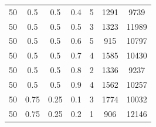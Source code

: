 \documentclass[12pt]{report}
\begin{document}
\begin{table}[H]
\begin{center}
\begin{tabular}{|c|c|c|c|c|c|c|}
				50 & 0.5 & 0.5 & 0.4 & 5 & 1291 & 9739 \\
				50 & 0.5 & 0.5 & 0.5 & 3 & 1323 & 11989 \\
				50 & 0.5 & 0.5 & 0.6 & 5 & 915 & 10797 \\
				50 & 0.5 & 0.5 & 0.7 & 4 & 1585 & 10430 \\
				50 & 0.5 & 0.5 & 0.8 & 2 & 1336 & 9237 \\
				50 & 0.5 & 0.5 & 0.9 & 4 & 1562 & 10257 \\
				50 & 0.75 & 0.25 & 0.1 & 3 & 1774 & 10032 \\
				50 & 0.75 & 0.25 & 0.2 & 1 & 906 & 12146 \\
				\hline
			\end{tabular}
		\end{center}
	\end{table}
	\newpage 
	
\end{document}
